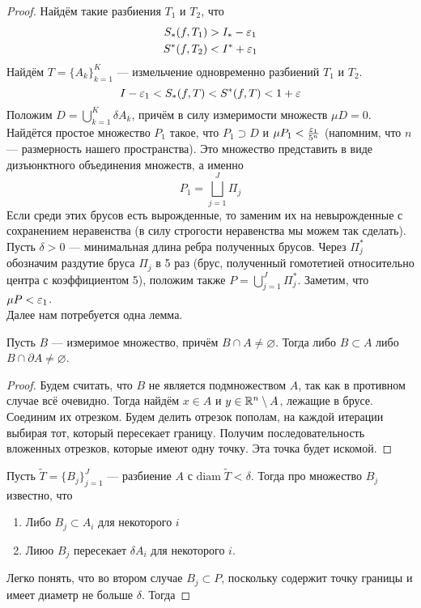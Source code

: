 \begin{proof}
    Найдём такие разбиения $T_1$ и $T_2$, что 
    \begin{gather}
        S_*(f, T_1) > I_* - \varepsilon_1\\
        S^*(f, T_2) < I^* + \varepsilon_1
    \end{gather}
    Найдём $T = \{A_k\}_{k =1}^{K}$ --- измельчение одновременно разбиений $T_1$ и $T_2$.
    $$
        I - \varepsilon_1 < S_*(f, T) < S^*(f, T) < 1 + \varepsilon
    $$
    Положим $D = \bigcup\limits_{k=1}^K \delta A_k$, причём в силу измеримости множеств $\mu D =0$. Найдётся простое множество $P_1$ такое, что $P_1 \supset D$ и $\mu P_1 < \frac{\varepsilon_1}{5^n}$ (напомним, что $n$ --- размерность нашего пространства). Это множество представить в виде дизъюнктного объединения множеств, а именно
    \[
        P_1 = \bigsqcup\limits_{j=1}^J \Pi_j 
    \]
    Если среди этих брусов есть вырожденные, то заменим их на невырожденные с сохранением неравенства (в силу строгости неравенства мы можем так сделать). Пусть $\delta > 0$ --- минимальная длина ребра полученных брусов. Через $\Pi_j^*$ обозначим раздутие бруса $\Pi_j$ в 5 раз (брус, полученный гомотетией относительно центра с коэффициентом 5), положим также $P = \bigcup\limits_{j=1}^J \Pi_j^*$. Заметим, что $\mu P < \varepsilon_1$.\\
    Далее нам потребуется одна лемма.
    \begin{Lemma}
        Пусть $B$ --- измеримое множество, причём $B \cap A \neq \varnothing$. Тогда либо $B \subset A$ либо $B \cap \partial A \neq \varnothing$.
    \end{Lemma}
    \begin{proof}
    Будем считать, что $B$ не является подмножеством $A$, так как в противном случае всё очевидно. Тогда найдём $x \in A$ и $y \in \mathbb{R}^n\setminus A$, лежащие в брусе. Соединим их отрезком. Будем делить отрезок пополам, на каждой итерации выбирая тот, который пересекает границу. Получим последовательность вложенных отрезков, которые имеют одну точку. Эта точка будет искомой.
    \end{proof}
    Пусть $\widetilde{T} = \{B_j\}_{j=1}^{J}$ --- разбиение $A$ с $\mathrm{diam}\; \widetilde T < \delta$. Тогда про множество $B_j$ известно, что
    \begin{enumerate}
        \item Либо $B_j \subset A_i$ для некоторого $i$
        \item Лиюо $B_j$ пересекает $\delta A_i$ для некоторого $i$.
    \end{enumerate}
    Легко понять, что во втором случае $B_j \subset P$, поскольку содержит точку границы и имеет диаметр не больше $\delta$. Тогда

\end{proof}
